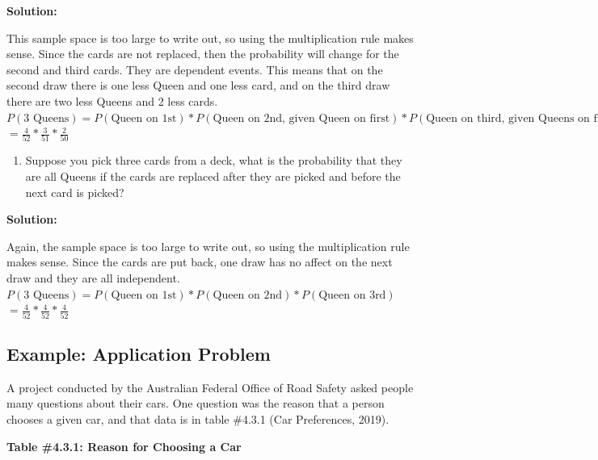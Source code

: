 \documentclass[
]{book}
\providecommand{\tightlist}{%
  \setlength{\itemsep}{0pt}\setlength{\parskip}{0pt}}
\begin{document}
\textbf{Solution:}

This sample space is too large to write out, so using the multiplication rule makes sense. Since the cards are not replaced, then the probability will change for the second and third cards. They are dependent events. This means that on the second draw there is one less Queen and one less card, and on the third draw there are two less Queens and 2 less cards.
\(P(\text{3 Queens})=P(\text{Queen on 1st})*P(\text{Queen on 2nd, given Queen on first})*P(\text{Queen on third, given Queens on fist 2 draws})\)
\(=\frac{4}{52}*\frac{3}{51}*\frac{2}{50}\)

\begin{enumerate}
\def\labelenumi{\alph{enumi}.}
\setcounter{enumi}{1}
\tightlist
\item
  Suppose you pick three cards from a deck, what is the probability
  that they are all Queens if the cards are replaced after they are
  picked and before the next card is picked?
\end{enumerate}

\textbf{Solution:}

Again, the sample space is too large to write out, so using the multiplication rule makes sense. Since the cards are put back, one draw has no affect on the next draw and they are all independent.
\(P(\text{3 Queens})=P(\text{Queen on 1st})*P(\text{Queen on 2nd})*P(\text{Queen on 3rd})\)
\(=\frac{4}{52}*\frac{4}{52}*\frac{4}{52}\)

\hypertarget{example-application-problem}{%
\subsection{Example: Application Problem}\label{example-application-problem}}

A project conducted by the Australian Federal Office of Road Safety asked people many questions about their cars. One question was the reason that a person chooses a given car, and that data is in table \#4.3.1 (Car Preferences, 2019).

\textbf{Table \#4.3.1: Reason for Choosing a Car}
\end{document}
